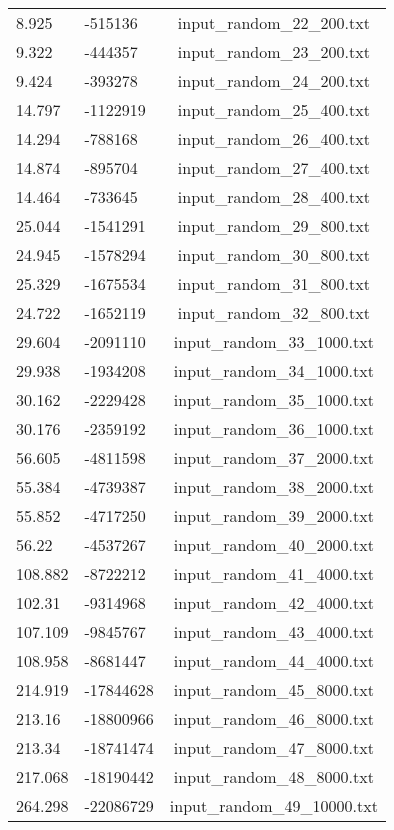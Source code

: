 \begin{longtable}[hb]{|l|l|c|}
    8.925 & -515136 & input\_random\_22\_200.txt \\
    9.322 & -444357 & input\_random\_23\_200.txt \\
    9.424 & -393278 & input\_random\_24\_200.txt \\
    14.797 & -1122919 & input\_random\_25\_400.txt \\
    14.294 & -788168 & input\_random\_26\_400.txt \\
    14.874 & -895704 & input\_random\_27\_400.txt \\
    14.464 & -733645 & input\_random\_28\_400.txt \\
    25.044 & -1541291 & input\_random\_29\_800.txt \\
    24.945 & -1578294 & input\_random\_30\_800.txt \\
    25.329 & -1675534 & input\_random\_31\_800.txt \\
    24.722 & -1652119 & input\_random\_32\_800.txt \\
    29.604 & -2091110 & input\_random\_33\_1000.txt \\
    29.938 & -1934208 & input\_random\_34\_1000.txt \\
    30.162 & -2229428 & input\_random\_35\_1000.txt \\
    30.176 & -2359192 & input\_random\_36\_1000.txt \\
    56.605 & -4811598 & input\_random\_37\_2000.txt \\
    55.384 & -4739387 & input\_random\_38\_2000.txt \\
    55.852 & -4717250 & input\_random\_39\_2000.txt \\
    56.22 & -4537267 & input\_random\_40\_2000.txt \\
    108.882 & -8722212 & input\_random\_41\_4000.txt \\
    102.31 & -9314968 & input\_random\_42\_4000.txt \\
    107.109 & -9845767 & input\_random\_43\_4000.txt \\
    108.958 & -8681447 & input\_random\_44\_4000.txt \\
    214.919 & -17844628 & input\_random\_45\_8000.txt \\
    213.16 & -18800966 & input\_random\_46\_8000.txt \\
    213.34 & -18741474 & input\_random\_47\_8000.txt \\
    217.068 & -18190442 & input\_random\_48\_8000.txt \\
    264.298 & -22086729 & input\_random\_49\_10000.txt \\

\end{longtable}
